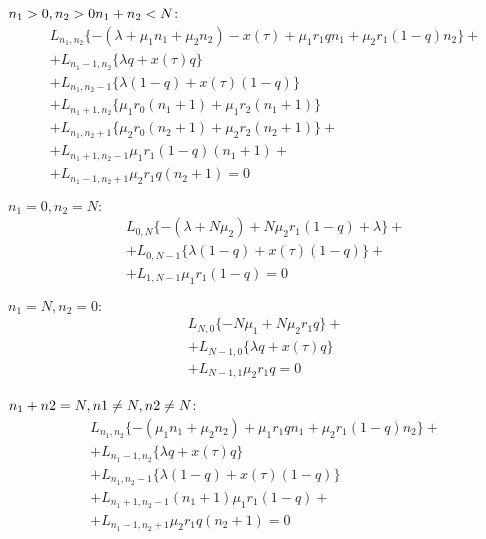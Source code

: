 $n_{1}>0, n_{2}>0\\
n_{1}+n_{2}< N$:\\
\begin{equation}\label{rEquationLong3}
	\begin{split}
		&L_{n_{1}, n_{2}}\{-(\lambda+\mu_{1}n_{1}+\mu_{2}n_{2}) - x(\tau)+ \mu_{1}r_{1}qn_{1}+ \mu_{2}r_{1}(1-q)n_{2}\}+\\
		&+L_{n_{1}-1, n_{2}}\{\lambda q+ x(\tau) q  \}\\
		&+L_{n_{1}, n_{2}-1}\{\lambda (1-q) + x(\tau) (1-q) \}\\
		&+L_{n_{1} +1 , n_{2}}\{ \mu_{1} r_{0}(n_{1}+1) + \mu_{1} r_{2} (n_{1}+1)\}\\
		&+L_{n_{1}, n_{2} + 1 }\{ \mu_{2} r_{0}(n_{2}+1)  + \mu_{2} r_{2} (n_{2}+1) \}+\\
		&+L_{n_{1} +1 , n_{2}-1}\mu_{1} r_{1}(1-q)(n_{1}+1) +\\
		&+ L_{n_{1} -1 , n_{2}+1}\mu_{2} r_{1}q(n_{2}+1)=0
	\end{split}
\end{equation}

$n_{1}=0, n_{2}=N:$\\
\begin{equation}\label{rEquationLong4}
	\begin{split}
		&L_{0, N}\{-(\lambda+N\mu_{2}) + N\mu_{2}r_{1}(1-q)+ \lambda \}+\\
		&+L_{0, N-1}\{\lambda (1-q) + x(\tau) (1-q) \}+\\
		&+L_{1 ,N-1}\mu_{1} r_{1}(1-q) =0
	\end{split}
\end{equation}

$n_{1}=N, n_{2}=0:$\\
\begin{equation}\label{rEquationLong5}
	\begin{split}
		&L_{N, 0}\{-N\mu_{1}+ N\mu_{2}r_{1}q\}+\\
		&+L_{N-1, 0}\{\lambda q+ x(\tau) q  \}\\
		&+L_{N -1 , 1}\mu_{2} r_{1}q =0
	\end{split}
\end{equation}

$n_{1}+n{2}=N,\\
n{1}\neq N, n{2}\neq N$:\\
\begin{equation}\label{rEquationLong6}
	\begin{split}
		&L_{n_{1}, n_{2}}\{-(\mu_{1}n_{1}+\mu_{2}n_{2}) + \mu_{1}r_{1}qn_{1}+ \mu_{2}r_{1}(1-q)n_{2}\}+\\
		&+L_{n_{1}-1, n_{2}}\{\lambda q+ x(\tau) q  \}\\
		&+L_{n_{1}, n_{2}-1}\{\lambda (1-q) +	 x(\tau) (1-q) \}\\
		&+L_{n_{1} +1 , n_{2}-1}(n_{1}+1)\mu_{1} r_{1}(1-q) +\\
		&+L_{n_{1} -1 , n_{2}+1}\mu_{2} r_{1}q(n_{2}+1) =0
	\end{split}
\end{equation}

